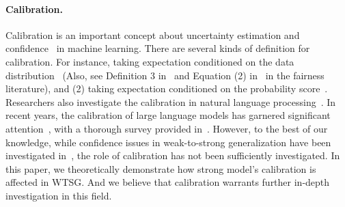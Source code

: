 \paragraph{Calibration.}
Calibration is an important concept about uncertainty estimation and confidence~\citep{guo2017calibration,kuleshov2018accurate,kumar2019verified,mehrtash2020confidence} in machine learning.
There are several kinds of definition for calibration. For instance, taking expectation conditioned on the data distribution~\citep{kull2019beyond,kumar2019verified,roelofs2022mitigating} (Also, see Definition 3 in~\citep{pleiss2017fairness} and Equation (2) in~\citep{liu2019implicit} in the fairness literature), and
(2) taking expectation conditioned on the probability score~\citep{naeini2015obtaining,guo2017calibration}.
Researchers also investigate the calibration in natural language processing~\citep{desai2020calibration,guo2021overview,ulmer2022exploring,chen-etal-2023-close}.
In recent years, the calibration of large language models has garnered significant attention~\citep{zhu2023calibration,tian2023just,liang2022holistic}, with a thorough survey provided in~\citep{geng2024survey}.
However, to the best of our knowledge, while confidence issues in weak-to-strong generalization have been investigated in~\citep{burns2023weak}, the role of calibration has not been sufficiently investigated.
In this paper, we theoretically demonstrate how strong model's calibration is affected in WTSG.
And we believe that calibration warrants further in-depth investigation in this field.





